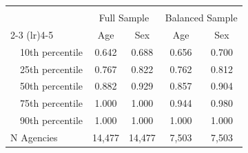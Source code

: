 \begin{tabular}{lcccc} \toprule \\[-2.5ex]
& \multicolumn{2}{c}{Full Sample} & \multicolumn{2}{c}{Balanced Sample} \\
\cmidrule(lr){2-3} \cmidrule(lr){4-5}
& \multicolumn{1}{c}{Age} & \multicolumn{1}{c}{Sex} & \multicolumn{1}{c}{Age} & \multicolumn{1}{c}{Sex} \\
\hline
~~10th percentile & 0.642 & 0.688 & 0.656 & 0.700 \\
~~25th percentile & 0.767 & 0.822 & 0.762 & 0.812 \\
~~50th percentile & 0.882 & 0.929 & 0.857 & 0.904 \\
~~75th percentile & 1.000 & 1.000 & 0.944 & 0.980 \\
~~90th percentile & 1.000 & 1.000 & 1.000 & 1.000 \\
\hline
N Agencies & \multicolumn{1}{c}{14,477} & \multicolumn{1}{c}{14,477} & \multicolumn{1}{c}{7,503} & \multicolumn{1}{c}{7,503}\\
\bottomrule
\end{tabular}
